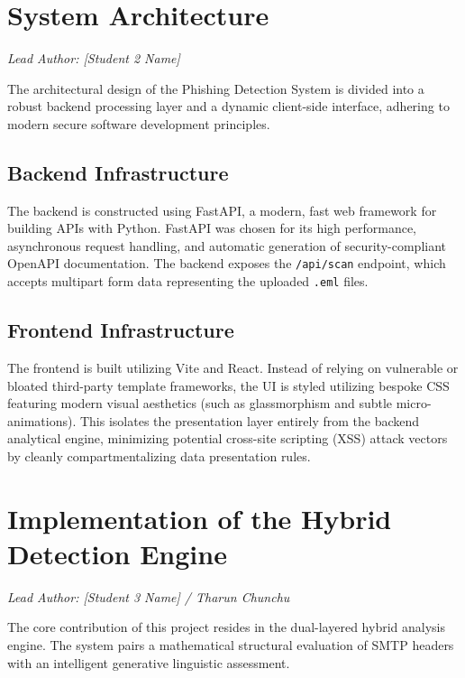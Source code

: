 \documentclass[conference]{IEEEtran}
\begin{document}
\section{System Architecture}
\textit{Lead Author: [Student 2 Name]}

The architectural design of the Phishing Detection System is divided into a robust backend processing layer and a dynamic client-side interface, adhering to modern secure software development principles.

\subsection{Backend Infrastructure}
The backend is constructed using FastAPI, a modern, fast web framework for building APIs with Python. FastAPI was chosen for its high performance, asynchronous request handling, and automatic generation of security-compliant OpenAPI documentation. The backend exposes the \texttt{/api/scan} endpoint, which accepts multipart form data representing the uploaded \texttt{.eml} files.

\subsection{Frontend Infrastructure}
The frontend is built utilizing Vite and React. Instead of relying on vulnerable or bloated third-party template frameworks, the UI is styled utilizing bespoke CSS featuring modern visual aesthetics (such as glassmorphism and subtle micro-animations). This isolates the presentation layer entirely from the backend analytical engine, minimizing potential cross-site scripting (XSS) attack vectors by cleanly compartmentalizing data presentation rules.

\section{Implementation of the Hybrid Detection Engine}
\textit{Lead Author: [Student 3 Name] / Tharun Chunchu}

The core contribution of this project resides in the dual-layered hybrid analysis engine. The system pairs a mathematical structural evaluation of SMTP headers with an intelligent generative linguistic assessment.
\end{document}
